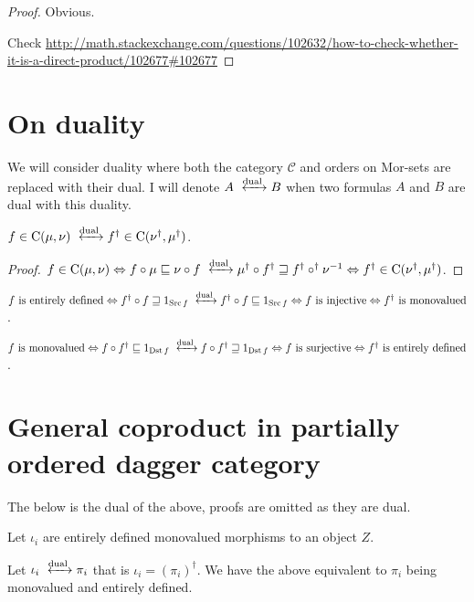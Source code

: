 \begin{proof}
  Obvious.
  
  Check
  \url{http://math.stackexchange.com/questions/102632/how-to-check-whether-it-is-a-direct-product/102677\#102677}
\end{proof}

\section{On duality}

We will consider duality where both the category $\mathcal{C}$ and orders on
Mor-sets are replaced with their dual. I will denote $A
\xleftrightarrow{\dual} B$ when two formulas $A$ and $B$ are dual with
this duality.

\begin{prop}
  $f \in \mathrm{C} (\mu, \nu) \xleftrightarrow{\dual} f^{\dagger}
  \in \mathrm{C} (\nu^{\dagger} , \mu^{\dagger})$.
\end{prop}

\begin{proof}
  $f \in \mathrm{C} (\mu, \nu) \Leftrightarrow f \circ \mu
  \sqsubseteq \nu \circ f \xleftrightarrow{\dual} \mu^{\dagger}
  \circ f^{\dagger} \sqsupseteq f^{\dagger} \circ^{\dagger} \nu^{- 1}
  \Leftrightarrow f^{\dagger} \in \mathrm{C} (\nu^{\dagger} ,
  \mu^{\dagger})$.
\end{proof}

$f \text{ is entirely defined} \Leftrightarrow f^{\dagger} \circ f \sqsupseteq
1_{\Src f} \xleftrightarrow{\dual} f^{\dagger} \circ f \sqsubseteq
1_{\Src f} \Leftrightarrow f \text{ is injective} \Leftrightarrow
f^{\dagger} \text{ is monovalued}$.

$f \text{ is monovalued} \Leftrightarrow f \circ f^{\dagger} \sqsubseteq
1_{\Dst f} \xleftrightarrow{\dual} f \circ f^{\dagger} \sqsupseteq
1_{\Dst f} \Leftrightarrow f \text{ is surjective} \Leftrightarrow
f^{\dagger} \text{ is entirely defined}$.

\section{General coproduct in partially ordered dagger category}

The below is the dual of the above, proofs are omitted as they are dual.

Let $\iota_i$  are entirely defined monovalued morphisms to an object $Z$.

Let $\iota_i \xleftrightarrow{\dual} \pi_i$ that is $\iota_i =
(\pi_i)^{\dagger}$. We have the above equivalent to $\pi_i$ being monovalued
and entirely defined.

